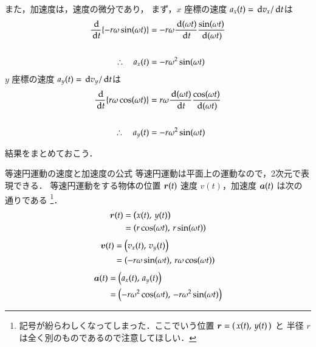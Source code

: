                 また，加速度は，速度の微分であり，
                まず，$x$ 座標の速度 $a_{x}(t) =\,\mathrm{d} v_{x} / \,\mathrm{d} t$は
                    \begin{align*}
                        \frac{\,\mathrm{d}}{\,\mathrm{d} t} \{-r\omega \sin(\omega t)\}
                            &= -r\omega\frac{\,\mathrm{d} (\omega t)}{\,\mathrm{d} t}\frac{\sin(\omega t)}{\,\mathrm{d} (\omega t)} \notag \\
                    \notag \\
                        \therefore\quad
                            a_{x}(t) &= -r\omega^{2} \sin(\omega t)
                    \end{align*}
                $y$ 座標の速度 $a_{y}(t) = \,\mathrm{d} v_{y} /\,\mathrm{d} t$は
                    \begin{align*}
                        \frac{\,\mathrm{d}}{\,\mathrm{d} t} \{r\omega \cos(\omega t)\}
                            &= r\omega\frac{\,\mathrm{d} (\omega t)}{\,\mathrm{d} t}\frac{\cos(\omega t)}{\,\mathrm{d} (\omega t)} \notag \\
                    \notag \\
                        \therefore\quad
                            a_{y}(t) &= -r\omega^{2} \sin(\omega t)
                    \end{align*}

                結果をまとめておこう．
                    \begin{myshadebox}{等速円運動の速度と加速度の公式}
                        等速円運動は平面上の運動なので，2次元で表現できる．
                        等速円運動をする物体の位置 $\boldsymbol{r}(t)$ 速度 $v(t)$，加速度 $\boldsymbol{a}(t)$ は次の
                        通りである
                            \footnote{
                                記号が紛らわしくなってしまった．ここでいう位置 $\boldsymbol{r} = (\, x(t) , \, y(t)\,)$ と
                                半径 $r$ は全く別のものであるので注意してほしい．
                            }．
                        \begin{align}
                            \boldsymbol{r}(t) &= \left( x(t) , \, y(t) \right) \notag \\
                                   &= \left( r\cos(\omega t),\, r\sin(\omega t) \right)
                        \end{align}
                        \begin{align}
                            \boldsymbol{v}(t) &= \left( v_{x}(t) , \, v_{y}(t) \right) \notag \\
                                   &= \left( -r\omega \sin(\omega t),\, r\omega \cos(\omega t) \right)
                        \end{align}
                        \begin{align}
                            \boldsymbol{a}(t) &= \left( a_{x}(t) , \, a_{y}(t) \right) \notag \\
                                   &= \left( -r\omega^{2} \cos(\omega t) ,\, -r\omega^{2} \sin(\omega t) \right)
                        \end{align}
                    \end{myshadebox}


